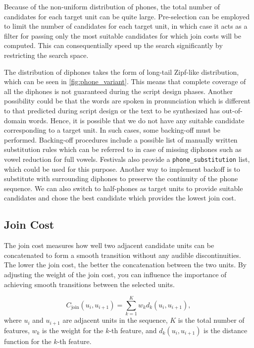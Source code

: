 \documentclass[lettersize,journal]{IEEEtran}
\begin{document}
Because of the non-uniform distribution of phones, the total number of candidates for each target unit can be quite large. Pre-selection can be employed to limit the number of candidates for each target unit, in which case it acts as a filter for passing only the most suitable candidates for which join costs will be computed. This can consequentially speed up the search significantly by restricting the search space.

The distribution of diphones takes the form of long-tail Zipf-like distribution, which can be seen in \autoref{fig:phone_variant}. This means that complete coverage of all the diphones is not guaranteed during the script design phases. Another possibility could be that the words are spoken in pronunciation which is different to that predicted during script design or the text to be synthesized has out-of-domain words. Hence, it is possible that we do not have any suitable candidate corresponding to a target unit. In such cases, some backing-off must be performed. Backing-off procedures include a possible list of manually written substitution rules which can be referred to in case of missing diphones such as vowel reduction for full vowels. Festivals also provide a \verb|phone_substitution| list, which could be used for this purpose. Another way to implement backoff is to substitute with surrounding diphones to preserve the continuity of the phone sequence. We can also switch to half-phones as target units to provide suitable candidates and chose the best candidate which provides the lowest join cost.

\subsection{Join Cost}

The join cost measures how well two adjacent candidate units can be concatenated to form a smooth transition without any audible discontinuities. The lower the join cost, the better the concatenation between the two units. By adjusting the weight of the join cost, you can influence the importance of achieving smooth transitions between the selected units. 

\begin{equation}
  C_{\text{join}}(u_i, u_{i+1}) = \sum_{k=1}^{K} w_k d_k(u_i, u_{i+1}),
\end{equation}
where $u_i$ and $u_{i+1}$ are adjacent units in the sequence, $K$ is the total number of features, $w_k$ is the weight for the $k$-th feature, and $d_k(u_i, u_{i+1})$ is the distance function for the $k$-th feature.
\end{document}
